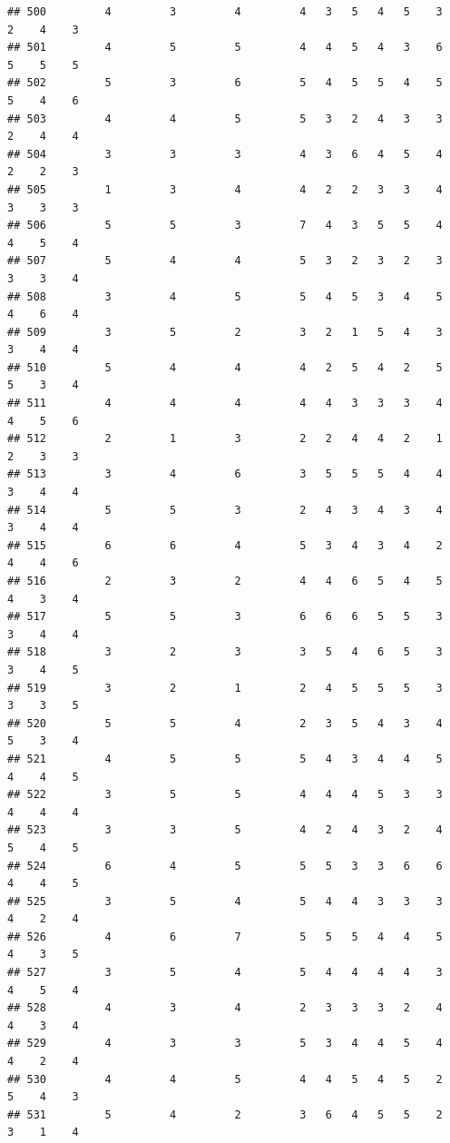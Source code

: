 \documentclass[
]{article}
\begin{document}
\begin{verbatim}
## 500         4         3         4         4   3   5   4   5    3    2    4    3
## 501         4         5         5         4   4   5   4   3    6    5    5    5
## 502         5         3         6         5   4   5   5   4    5    5    4    6
## 503         4         4         5         5   3   2   4   3    3    2    4    4
## 504         3         3         3         4   3   6   4   5    4    2    2    3
## 505         1         3         4         4   2   2   3   3    4    3    3    3
## 506         5         5         3         7   4   3   5   5    4    4    5    4
## 507         5         4         4         5   3   2   3   2    3    3    3    4
## 508         3         4         5         5   4   5   3   4    5    4    6    4
## 509         3         5         2         3   2   1   5   4    3    3    4    4
## 510         5         4         4         4   2   5   4   2    5    5    3    4
## 511         4         4         4         4   4   3   3   3    4    4    5    6
## 512         2         1         3         2   2   4   4   2    1    2    3    3
## 513         3         4         6         3   5   5   5   4    4    3    4    4
## 514         5         5         3         2   4   3   4   3    4    3    4    4
## 515         6         6         4         5   3   4   3   4    2    4    4    6
## 516         2         3         2         4   4   6   5   4    5    4    3    4
## 517         5         5         3         6   6   6   5   5    3    3    4    4
## 518         3         2         3         3   5   4   6   5    3    3    4    5
## 519         3         2         1         2   4   5   5   5    3    3    3    5
## 520         5         5         4         2   3   5   4   3    4    5    3    4
## 521         4         5         5         5   4   3   4   4    5    4    4    5
## 522         3         5         5         4   4   4   5   3    3    4    4    4
## 523         3         3         5         4   2   4   3   2    4    5    4    5
## 524         6         4         5         5   5   3   3   6    6    4    4    5
## 525         3         5         4         5   4   4   3   3    3    4    2    4
## 526         4         6         7         5   5   5   4   4    5    4    3    5
## 527         3         5         4         5   4   4   4   4    3    4    5    4
## 528         4         3         4         2   3   3   3   2    4    4    3    4
## 529         4         3         3         5   3   4   4   5    4    4    2    4
## 530         4         4         5         4   4   5   4   5    2    5    4    3
## 531         5         4         2         3   6   4   5   5    2    3    1    4

\end{verbatim}
\end{document}
